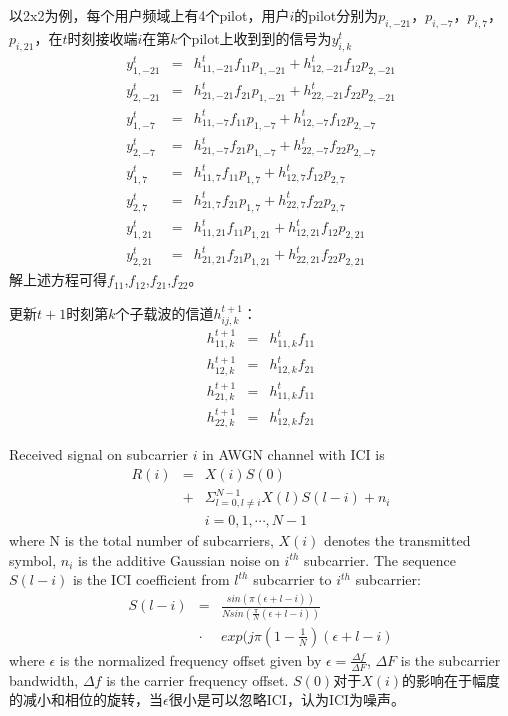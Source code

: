 以2x2为例，每个用户频域上有4个pilot，用户$i$的pilot分别为$p_{i,-21}$，$p_{i,-7}$，$p_{i,7}$，$p_{i,21}$，在$t$时刻接收端$i$在第$k$个pilot上收到到的信号为$y_{i, k}^{t}$
\begin{eqnarray}
y_{1, -21}^{t} & = & h_{11,-21}^{t}f_{11}p_{1,-21} + h_{12,-21}^{t}f_{12}p_{2,-21} \\
y_{2, -21}^{t} & = & h_{21,-21}^{t}f_{21}p_{1,-21} + h_{22,-21}^{t}f_{22}p_{2,-21} \\
y_{1, -7}^{t}   & = & h_{11,-7}^{t}f_{11}p_{1,-7} + h_{12,-7}^{t}f_{12}p_{2,-7} \\
y_{2, -7}^{t}   & = & h_{21,-7}^{t}f_{21}p_{1,-7} + h_{22,-7}^{t}f_{22}p_{2,-7} \\
y_{1, 7}^{t}   & = & h_{11,7}^{t}f_{11}p_{1,7} + h_{12,7}^{t}f_{12}p_{2,7} \\
y_{2, 7}^{t}   & = & h_{21,7}^{t}f_{21}p_{1,7} + h_{22,7}^{t}f_{22}p_{2,7} \\
y_{1, 21}^{t} & = & h_{11,21}^{t}f_{11}p_{1,21} + h_{12,21}^{t}f_{12}p_{2,21} \\
y_{2, 21}^{t} & = & h_{21,21}^{t}f_{21}p_{1,21} + h_{22,21}^{t}f_{22}p_{2,21}
\end{eqnarray}
解上述方程可得$f_{11}$,$f_{12}$,$f_{21}$,$f_{22}$。

更新$t+1$时刻第$k$个子载波的信道$h_{ij, k}^{t+1}$：
\begin{eqnarray}
h_{11, k}^{t+1} & = & h_{11,k}^{t}f_{11} \\
h_{12, k}^{t+1} & = & h_{12,k}^{t}f_{21}\\
h_{21, k}^{t+1} & = & h_{11,k}^{t}f_{11} \\
h_{22, k}^{t+1} & = & h_{12,k}^{t}f_{21}
\end{eqnarray}

Received signal on subcarrier $i$ in AWGN channel with ICI is
\begin{eqnarray}
R(i) & = & X(i)S(0) \\
      & + & \Sigma_{l=0, l \neq i}^{N-1} X(l)S(l-i) + n_{i} \\
      &     & i = 0, 1, \cdots, N-1 \nonumber
\end{eqnarray}
where N is the total number of subcarriers, $X(i)$ denotes the transmitted symbol, $n_{i}$ is the additive Gaussian noise on $i^{th}$ subcarrier. The sequence $S(l-i)$ is the ICI coefficient from $l^{th}$ subcarrier to $i^{th}$ subcarrier:
\begin{eqnarray}
S(l-i) & = & \frac{sin(\pi (\epsilon + l - i))}{N sin(\frac{\pi}{N}(\epsilon + l - i))} \\
         & \cdot  & exp( j\pi (1 - \frac{1}{N})(\epsilon + l - i)
\end{eqnarray}
where $\epsilon$ is the normalized frequency offset given by $\epsilon = \frac{\Delta f}{\Delta F}$, $\Delta F$ is the subcarrier bandwidth, $\Delta f$ is the carrier frequency offset.
$S(0)$对于$X(i)$的影响在于幅度的减小和相位的旋转，当$\epsilon$很小是可以忽略ICI，认为ICI为噪声。


